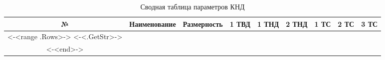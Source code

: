 \begin{landscape}
    \begin{center}
        \begin{longtable}{|c|c|c|c|c|c|c|c|c|}
            \hline
            \textbf{№} &
            \textbf{Наименование} &
            \textbf{Размерность} &
            \textbf{1 ТВД} &
            \textbf{1 ТНД} &
            \textbf{2 ТНД} &
            \textbf{1 ТС} &
            \textbf{2 ТС} &
            \textbf{3 ТС} \\\hline
            \endhead
            <-<range .Rows>->
            <-<.GetStr>-> \\\hline
            <-<end>->
            \caption{Сводная таблица параметров КНД} \label{tab:turbine-stage-total}
        \end{longtable}
    \end{center}
\end{landscape}